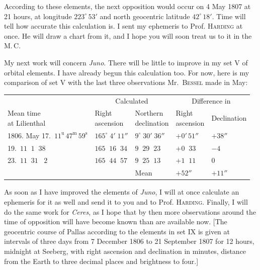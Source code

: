 \par\indent According to these elements, the next opposition would occur on 4 May 1807 at 21 hours, at longitude $223^\circ\,53'$ and north geocentric latitude $42^\circ\,18'$. Time will tell how accurate this calculation is. I sent my ephemeris to Prof. \textsc{Harding} at once. He will draw a chart from it, and I hope you will soon treat us to it in the M.\,C.
%
\par\indent My next work will concern \emph{Juno}. There will be little to improve in my set V of orbital elements. I have already begun this calculation too. For now, here is my comparison of set V with the last three observations Mr.~\textsc{Bessel} made in May:

\begin{center}\begingroup
\fontsize{9}{11}\selectfont
\setlength{\tabcolsep}{2pt}\renewcommand{\arraystretch}{1.12}
\begin{tabular}{l|l|l|l|l}
& \multicolumn{2}{c|}{Calculated} & \multicolumn{2}{c}{Difference in} \\
\shortstack{Mean time\\at Lilienthal} & \shortstack{Right\\ascension} & \shortstack{Northern\\declination} & \shortstack{Right\\ascension} & Declination \\
\hline
1806. May 17.\ $11^{\mathrm{u}}\,47^{\mathrm{m}}\,59^{\mathrm{s}}$ & $165^\circ\;4'\;11''$ & $9^\circ\;30'\;36''$ & $+0'\,51''$ & $+38''$ \\
19.\ $11\;\;1\;\;38$ & $165\;\;16\;\;34$ & $9\;\;29\;\;23$ & $+0\;\;33$ & $-4$ \\
23.\ $11\;\;31\;\;\;2$ & $165\;\;44\;\;57$ & $9\;\;25\;\;13$ & $+1\;\;11$ & $0$ \\
\cline{3-5}
& & Mean & $+52''$ & $+11''$ \\
\end{tabular}\endgroup\end{center}

\par\indent As soon as I have improved the elements of \emph{Juno}, I will at once calculate an ephemeris for it as well and send it to you and to Prof. \textsc{Harding}. Finally, I will do the same work for \emph{Ceres}, as I hope that by then more observations around the time of opposition will have become known than are available now. [The geocentric course of Pallas according to the elements in set IX is given at intervals of three days from 7 December 1806 to 21 September 1807 for 12 hours, midnight at Seeberg, with right ascension and declination in minutes, distance from the Earth to three decimal places and brightness to four.]
